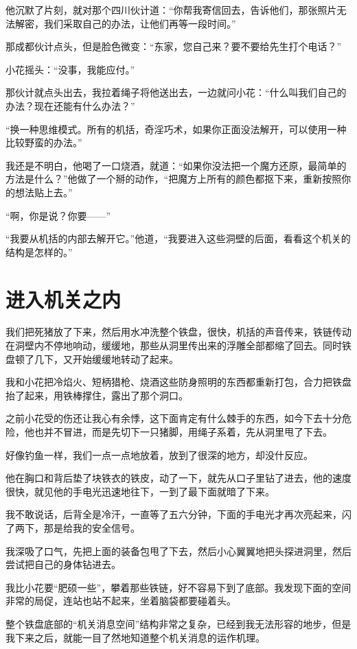 他沉默了片刻，就对那个四川伙计道：“你帮我寄信回去，告诉他们，那张照片无法解密，我们采取自己的办法，让他们再等一段时间。”

那成都伙计点头，但是脸色微变：“东家，您自己来？要不要给先生打个电话？”

小花摇头：“没事，我能应付。”

那伙计就点头出去，我拉着绳子将他送出去，一边就问小花：“什么叫我们自己的办法？现在还能有什么办法？”

“换一种思维模式。所有的机括，奇淫巧术，如果你正面没法解开，可以使用一种比较野蛮的办法。”

我还是不明白，他喝了一口烧酒，就道：“如果你没法把一个魔方还原，最简单的方法是什么？”他做了一个掰的动作，“把魔方上所有的颜色都抠下来，重新按照你的想法贴上去。”

“啊，你是说？你要——”

“我要从机括的内部去解开它。”他道，“我要进入这些洞壁的后面，看看这个机关的结构是怎样的。”

\chapter{进入机关之内}

我们把死猪放了下来，然后用水冲洗整个铁盘，很快，机括的声音传来，铁链传动在洞壁内不停地响动，缓缓地，那些从洞里传出来的浮雕全部都缩了回去。同时铁盘顿了几下，又开始缓缓地转动了起来。

我和小花把冷焰火、短柄猎枪、烧酒这些防身照明的东西都重新打包，合力把铁盘抬了起来，用铁棒撑住，露出了那个洞口。

之前小花受的伤还让我心有余悸，这下面肯定有什么棘手的东西，如今下去十分危险，他也并不冒进，而是先切下一只猪脚，用绳子系着，先从洞里甩了下去。

好像钓鱼一样，我们一点一点地放着，放到了很深的地方，却没什反应。

他在胸口和背后垫了块铁衣的铁皮，动了一下，就先从口子里钻了进去，他的速度很快，就见他的手电光迅速地往下，一到了最下面就暗了下来。

我不敢说话，后背全是冷汗，一直等了五六分钟，下面的手电光才再次亮起来，闪了两下，那是给我的安全信号。

我深吸了口气，先把上面的装备包甩了下去，然后小心翼翼地把头探进洞里，然后尝试把自己的身体钻进去。

我比小花要“肥硕一些”，攀着那些铁链，好不容易下到了底部。我发现下面的空间非常的局促，连站也站不起来，坐着脑袋都要碰着头。

整个铁盘底部的“机关消息空间”结构非常之复杂，已经到我无法形容的地步，但是我下来之后，就能一目了然地知道整个机关消息的运作机理。

